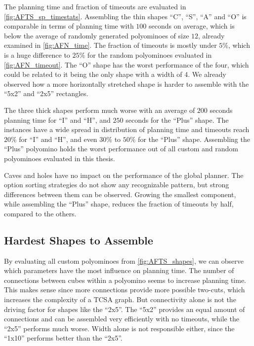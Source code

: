 The planning time and fraction of timeouts are evaluated in \autoref{fig:AFTS_sp_timestats}.
Assembling the thin shapes ``C'', ``S'', ``A'' and ``O'' is comparable in terms of planning time with $100$ seconds on average, which is below the average of randomly generated polyominoes of size $12$, already examined in \autoref{fig:AFN_time}.
The fraction of timeouts is mostly under $5\%$, which is a huge difference to $25\%$ for the random polyominoes evaluated in \autoref{fig:AFN_timeout}.
The ``O'' shape has the worst performance of the four, which could be related to it being the only shape with a width of 4.
We already observed how a more horizontally stretched shape is harder to assemble with the ``5x2'' and ``2x5'' rectangles.

The three thick shapes perform much worse with an average of $200$ seconds planning time for ``I'' and ``H'', and $250$ seconds for the ``Plus'' shape.
The instances have a wide spread in distribution of planning time and timeouts reach $20\%$ for ``I'' and ``H'', and even $30\%$ to $50\%$ for the ``Plus'' shape.
Assembling the ``Plus'' polyomino holds the worst performance out of all custom and random polyominoes evaluated in this thesis.

Caves and holes have no impact on the performance of the global planner.
The option sorting strategies do not show any recognizable pattern, but strong differences between them can be observed.
Growing the smallest component, while assembling the ``Plus'' shape, reduces the fraction of timeouts by half, compared to the others.

\newpage

\subsection{Hardest Shapes to Assemble}
\label{sec:hard_shape}

By evaluating all custom polyominoes from \autoref{fig:AFTS_shapes}, we can observe which parameters have the most influence on planning time.
The number of connections between cubes within a polyomino seems to increase planning time.
This makes sense since more connections provide more possible two-cuts, which increases the complexity of a TCSA graph.
But connectivity alone is not the driving factor for shapes like the ``2x5''.
The ``5x2'' provides an equal amount of connections and can be assembled very efficiently with no timeouts, while the ``2x5'' performs much worse.
Width alone is not responsible either, since the ``1x10'' performs better than the ``2x5''.

